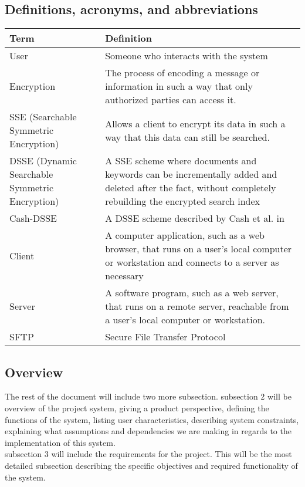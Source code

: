 \subsection{ Definitions, acronyms, and abbreviations }
    \begin{tabular}{| p{3.5cm} | p{12.5cm} |}
    \hline
	\textbf{Term} & \textbf{Definition} \\ \hline
    User & Someone who interacts with the system \\ \hline
    Encryption & The process of encoding a message or information in such a way that only authorized parties can access it. \\ \hline
    SSE (Searchable Symmetric Encryption) & Allows a client to encrypt its data in such a way that this data can still be searched.  \\ \hline
    DSSE (Dynamic Searchable Symmetric Encryption) & A SSE scheme where documents and keywords can be incrementally added and deleted after the fact, without completely rebuilding the encrypted search index  \\ \hline
    Cash-DSSE & A DSSE scheme described by Cash et al. in \cite{cash14} \\ \hline
    Client & A computer application, such as a web browser, that runs on a user's local computer or workstation and connects to a server as 		necessary \\ \hline
    Server &  A software program, such as a web server, that runs on a remote server, reachable from a user's local computer or workstation. \\ \hline
    SFTP & Secure File Transfer Protocol \\ \hline
    \end{tabular}



\subsection{ Overview }
The rest of the document will include two more subsection. subsection 2 will be overview of the project system, giving a product perspective, defining the functions of the system, listing user characteristics,  describing system constraints, explaining what assumptions and dependencies we are making in regards to the implementation of this system. \\
subsection 3 will include the requirements for the project. This will be the most detailed subsection describing the specific objectives and required functionality of the system.


